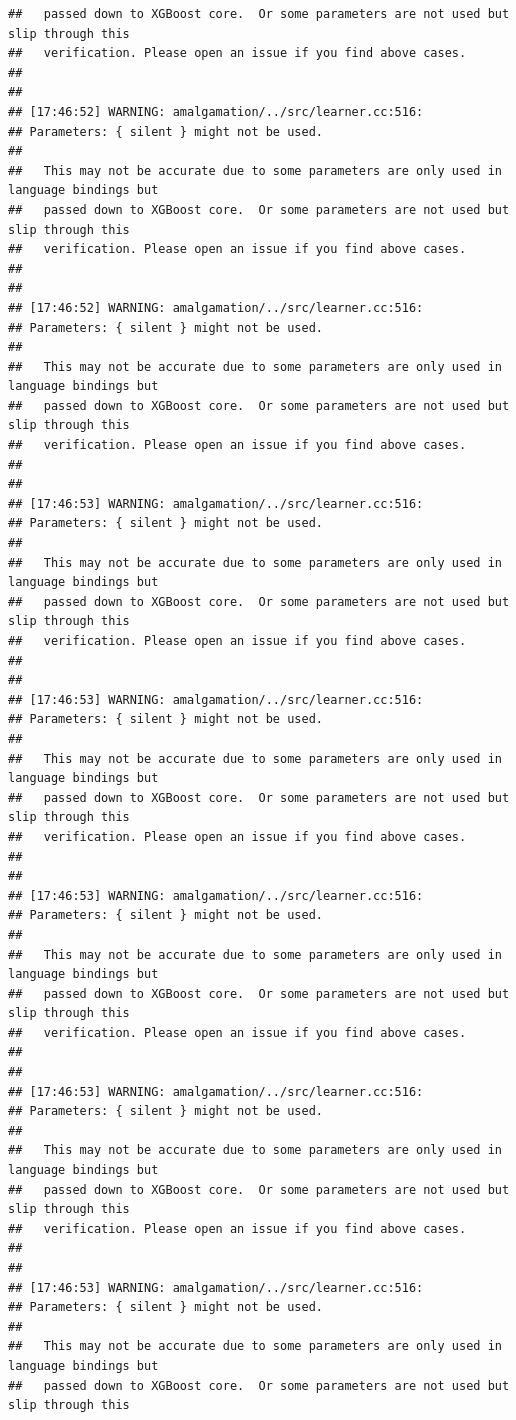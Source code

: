 \documentclass[AMS,STIX2COL]{WileyNJD-v2}\usepackage[]{graphicx}\usepackage[]{color}
\makeatletter
\newenvironment{kframe}{%
 \def\at@end@of@kframe{}%
 \ifinner\ifhmode%
  \def\at@end@of@kframe{\end{minipage}}%
  \begin{minipage}{\columnwidth}%
 \fi\fi%
 \def\FrameCommand##1{\hskip\@totalleftmargin \hskip-\fboxsep
 \colorbox{shadecolor}{##1}\hskip-\fboxsep
     \hskip-\linewidth \hskip-\@totalleftmargin \hskip\columnwidth}%
 \MakeFramed {\advance\hsize-\width
   \@totalleftmargin\z@ \linewidth\hsize
   \@setminipage}}%
 {\par\unskip\endMakeFramed%
 \at@end@of@kframe}
\newenvironment{knitrout}{}{} %
\makeatother
\begin{document}
\begin{knitrout}
\begin{kframe}
\begin{verbatim}
##   passed down to XGBoost core.  Or some parameters are not used but slip through this
##   verification. Please open an issue if you find above cases.
## 
## 
## [17:46:52] WARNING: amalgamation/../src/learner.cc:516: 
## Parameters: { silent } might not be used.
## 
##   This may not be accurate due to some parameters are only used in language bindings but
##   passed down to XGBoost core.  Or some parameters are not used but slip through this
##   verification. Please open an issue if you find above cases.
## 
## 
## [17:46:52] WARNING: amalgamation/../src/learner.cc:516: 
## Parameters: { silent } might not be used.
## 
##   This may not be accurate due to some parameters are only used in language bindings but
##   passed down to XGBoost core.  Or some parameters are not used but slip through this
##   verification. Please open an issue if you find above cases.
## 
## 
## [17:46:53] WARNING: amalgamation/../src/learner.cc:516: 
## Parameters: { silent } might not be used.
## 
##   This may not be accurate due to some parameters are only used in language bindings but
##   passed down to XGBoost core.  Or some parameters are not used but slip through this
##   verification. Please open an issue if you find above cases.
## 
## 
## [17:46:53] WARNING: amalgamation/../src/learner.cc:516: 
## Parameters: { silent } might not be used.
## 
##   This may not be accurate due to some parameters are only used in language bindings but
##   passed down to XGBoost core.  Or some parameters are not used but slip through this
##   verification. Please open an issue if you find above cases.
## 
## 
## [17:46:53] WARNING: amalgamation/../src/learner.cc:516: 
## Parameters: { silent } might not be used.
## 
##   This may not be accurate due to some parameters are only used in language bindings but
##   passed down to XGBoost core.  Or some parameters are not used but slip through this
##   verification. Please open an issue if you find above cases.
## 
## 
## [17:46:53] WARNING: amalgamation/../src/learner.cc:516: 
## Parameters: { silent } might not be used.
## 
##   This may not be accurate due to some parameters are only used in language bindings but
##   passed down to XGBoost core.  Or some parameters are not used but slip through this
##   verification. Please open an issue if you find above cases.
## 
## 
## [17:46:53] WARNING: amalgamation/../src/learner.cc:516: 
## Parameters: { silent } might not be used.
## 
##   This may not be accurate due to some parameters are only used in language bindings but
##   passed down to XGBoost core.  Or some parameters are not used but slip through this

\end{verbatim}
\end{kframe}
\end{knitrout}
\end{document}
